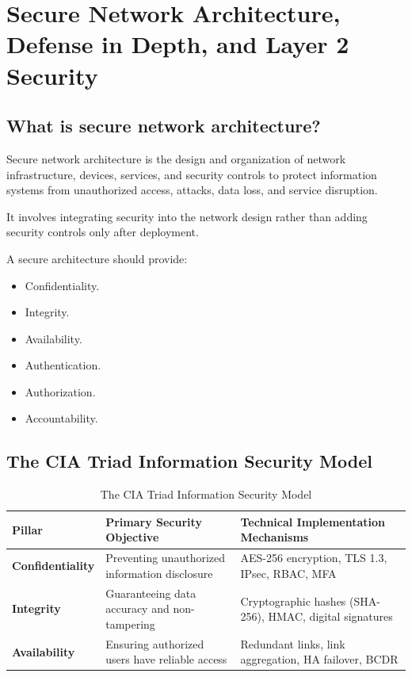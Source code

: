 \section{Secure Network Architecture, Defense in Depth, and Layer 2 Security}



\subsection{What is secure network architecture?}

Secure network architecture is the design and organization of network infrastructure, devices, services, and security controls to protect information systems from unauthorized access, attacks, data loss, and service disruption.

It involves integrating security into the network design rather than adding security controls only after deployment.

A secure architecture should provide:

\begin{itemize}
\item Confidentiality.
\item Integrity.
\item Availability.
\item Authentication.
\item Authorization.
\item Accountability.
\end{itemize}

\subsection{The CIA Triad Information Security Model}
\begin{table}[htbp]
\centering
\caption{The CIA Triad Information Security Model}
\label{tab:cia_triad}
\begin{tabularx}{\textwidth}{p{3.2cm} p{4.2cm} X}
\toprule
\textbf{Pillar} & \textbf{Primary Security Objective} & \textbf{Technical Implementation Mechanisms} \\
\midrule
\textbf{Confidentiality} & Preventing unauthorized information disclosure & AES-256 encryption, TLS 1.3, IPsec, RBAC, MFA \\
\textbf{Integrity} & Guaranteeing data accuracy and non-tampering & Cryptographic hashes (SHA-256), HMAC, digital signatures \\
\textbf{Availability} & Ensuring authorized users have reliable access & Redundant links, link aggregation, HA failover, BCDR \\
\bottomrule
\end{tabularx}
\end{table}

